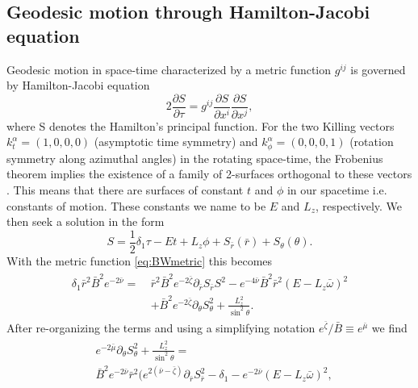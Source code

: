 \documentclass[iop, usenatbib]{emulateapj}
\newcommand{\be}{\begin{equation}}
\newcommand{\ee}{\end{equation}}
\newcommand{\pd}{\ensuremath{\partial}} %
\newcommand{\rb}{\ensuremath{\bar{r}}}
\newcommand{\wb}{\ensuremath{\bar{\omega}}}
\newcommand{\nub}{\ensuremath{\bar{\nu}}}
\newcommand{\zetab}{\ensuremath{\bar{\zeta}}}
\newcommand{\Bb}{\ensuremath{\bar{B}}}
\newcommand{\mub}{\ensuremath{\bar{\mu}}}
\begin{document}
\subsection{Geodesic motion through Hamilton-Jacobi equation}
Geodesic motion in space-time characterized by a metric function $g^{ij}$ is governed by Hamilton-Jacobi equation
\be
2\frac{\pd S}{\pd \tau} = g^{ij} \frac{\pd S}{\pd x^i}\frac{\pd S}{\pd x^j},
\ee
where S denotes the Hamilton's principal function.
For the two Killing vectors $k_{t}^{\alpha} = (1,0,0,0)$ (asymptotic time symmetry) and $k_{\phi}^{\alpha} = (0,0,0,1)$ (rotation symmetry along azimuthal angles) in the rotating space-time, the Frobenius theorem implies the existence of a family of 2-surfaces orthogonal to these vectors \citep[see e.g][p.12]{rcs}.
This means that there are surfaces of constant $t$ and $\phi$ in our spacetime i.e. constants of motion.
These constants we name to be $E$ and $L_z$, respectively.
We then seek a solution in the form
\be
S = \frac{1}{2}\delta_1 \tau - Et + L_z\phi + S_{\rb}(\rb) + S_{\theta}(\theta).
\ee
With the metric function \eqref{eq:BWmetric} this becomes
\begin{align}\begin{split} 
    \delta_1 \rb^2 \Bb^2 e^{-2\nub} =~& \rb^2 \Bb^2 e^{-2\zetab} \pd_{\rb}S_{\rb}S^2 - e^{-4\nub} \Bb^2 \rb^2 (E - L_z \wb)^2 \\
                                & + \Bb^2 e^{-2\zetab} \pd_{\theta}S_{\theta}^2 + \frac{L_z^2}{\sin^2\theta}.
\end{split}\end{align}
After re-organizing the terms and using a simplifying notation $e^{\zetab}/\Bb \equiv e^{\mub}$ we find
\begin{align}\begin{split}\label{eq:S}
& e^{-2\mub}\pd_{\theta}S_{\theta}^2 + \frac{L_z^2}{\sin^2\theta} = \\ 
& \Bb^2 e^{-2\nub}\rb^2 ( e^{2(\nub-\zetab)} \pd_{\rb}S_{\rb}^2 -\delta_{1} - e^{-2\nub}(E - L_z \wb)^2,
\end{split}\end{align}
\end{document}
